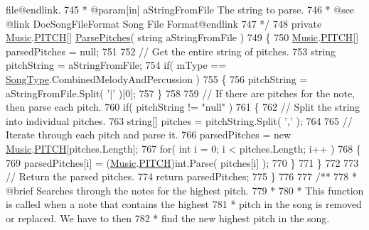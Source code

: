 \begin{DoxyCodeInclude}
{       file@endlink.}
745 \textcolor{comment}{     * @param[in] aStringFromFile The string to parse.}
746 \textcolor{comment}{     * @see @link DocSongFileFormat Song File Format@endlink}
747 \textcolor{comment}{    */}
748     \textcolor{keyword}{private} \hyperlink{class_music}{Music}.\hyperlink{group___music_enums_ga508f69b199ea518f935486c990edac1d}{PITCH}[] \hyperlink{group___song_priv_func_gacf6fee93921e1a5edbc477c0898c357a}{ParsePitches}( \textcolor{keywordtype}{string} aStringFromFile )
749     \{
750         \hyperlink{class_music}{Music}.\hyperlink{group___music_enums_ga508f69b199ea518f935486c990edac1d}{PITCH}[] parsedPitches = null;
751 
752         \textcolor{comment}{// Get the entire string of pitches.}
753         \textcolor{keywordtype}{string} pitchString = aStringFromFile;
754         \textcolor{keywordflow}{if}( mType == \hyperlink{group___song_enums_gae681a1f001333e39fc1cb4fea97bfe1b}{SongType}.CombinedMelodyAndPercussion )
755         \{
756             pitchString = aStringFromFile.Split( \textcolor{charliteral}{'|'} )[0];
757         \}
758 
759         \textcolor{comment}{// If there are pitches for the note, then parse each pitch.}
760         \textcolor{keywordflow}{if}( pitchString != \textcolor{stringliteral}{"null"} )
761         \{
762             \textcolor{comment}{// Split the string into individual pitches.}
763             \textcolor{keywordtype}{string}[] pitches = pitchString.Split( \textcolor{charliteral}{','} );
764 
765             \textcolor{comment}{// Iterate through each pitch and parse it.}
766             parsedPitches = \textcolor{keyword}{new} \hyperlink{class_music}{Music}.\hyperlink{group___music_enums_ga508f69b199ea518f935486c990edac1d}{PITCH}[pitches.Length];
767             \textcolor{keywordflow}{for}( \textcolor{keywordtype}{int} i = 0; i < pitches.Length; i++ )
768             \{
769                 parsedPitches[i] = (\hyperlink{class_music}{Music}.\hyperlink{group___music_enums_ga508f69b199ea518f935486c990edac1d}{PITCH})\textcolor{keywordtype}{int}.Parse( pitches[i] );
770             \}
771         \}
772 
773         \textcolor{comment}{// Return the parsed pitches.}
774         \textcolor{keywordflow}{return} parsedPitches;
775     \}
776 \textcolor{comment}{}
777 \textcolor{comment}{    /**}
778 \textcolor{comment}{     * @brief Searches through the notes for the highest pitch. }
779 \textcolor{comment}{     * }
780 \textcolor{comment}{     * This function is called when a note that contains the highest}
781 \textcolor{comment}{     * pitch in the song is removed or replaced. We have to then}
782 \textcolor{comment}{     * find the new highest pitch in the song.}

\end{DoxyCodeInclude}
